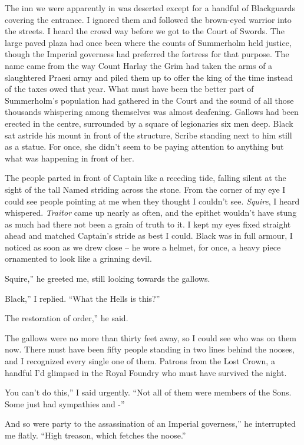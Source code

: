 \documentclass[12pt, openany]{book}
\begin{document}
The inn we were apparently in was deserted except for a handful of Blackguards covering the entrance. I ignored them and followed the brown-eyed warrior into the streets. I heard the crowd way before we got to the Court of Swords. The large paved plaza had once been where the counts of Summerholm held justice, though the Imperial governess had preferred the fortress for that purpose. The name came from the way Count Harlay the Grim had taken the arms of a slaughtered Praesi army and piled them up to offer the king of the time instead of the taxes owed that year. What must have been the better part of Summerholm’s population had gathered in the Court and the sound of all those thousands whispering among themselves was almost deafening. Gallows had been erected in the centre, surrounded by a square of legionaries six men deep. Black sat astride his mount in front of the structure, Scribe standing next to him still as a statue. For once, she didn’t seem to be paying attention to anything but what was happening in front of her. 

The people parted in front of Captain like a receding tide, falling silent at the sight of the tall Named striding across the stone. From the corner of my eye I could see people pointing at me when they thought I couldn’t see. \textit{Squire}, I heard whispered. \textit{Traitor} came up nearly as often, and the epithet wouldn’t have stung as much had there not been a grain of truth to it. I kept my eyes fixed straight ahead and matched Captain’s stride as best I could. Black was in full armour, I noticed as soon as we drew close – he wore a helmet, for once, a heavy piece ornamented to look like a grinning devil.

Squire,” he greeted me, still looking towards the gallows.

Black,” I replied. “What the Hells is this?”

The restoration of order,” he said.

The gallows were no more than thirty feet away, so I could see who was on them now. There must have been fifty people standing in two lines behind the nooses, and I recognized every single one of them. Patrons from the Lost Crown, a handful I’d glimpsed in the Royal Foundry who must have survived the night.

You can’t do this,” I said urgently. “Not all of them were members of the Sons. Some just had sympathies and -”

And so were party to the assassination of an Imperial governess,” he interrupted me flatly. “High treason, which fetches the noose.”
\end{document}
